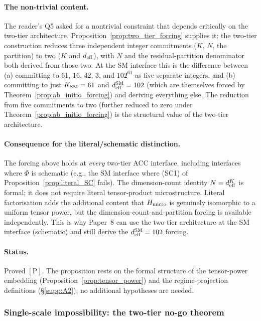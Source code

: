 \documentclass[11pt]{article}
\theoremstyle{plain}
\theoremstyle{definition}
\theoremstyle{remark}
\begin{document}
\paragraph{The non-trivial content.}  The reader's Q5 asked for a nontrivial constraint that depends critically on the two-tier architecture.  Proposition~\ref{prop:two_tier_forcing} supplies it: the two-tier construction reduces three independent integer commitments ($K$, $N$, the partition) to two ($K$ and $d_{\rm eff}$), with $N$ and the residual-partition denominator both derived from those two.  At the SM interface this is the difference between (a) committing to 61, 16, 42, 3, and $102^{61}$ as five separate integers, and (b) committing to just $K_{\rm SM} = 61$ and $d_{\rm eff}^{\rm SM} = 102$ (which are themselves forced by Theorem~\ref{prop:ab_initio_forcing}) and deriving everything else.  The reduction from five commitments to two (further reduced to zero under Theorem~\ref{prop:ab_initio_forcing}) is the structural value of the two-tier architecture.

\paragraph{Consequence for the literal/schematic distinction.}  The forcing above holds at \emph{every} two-tier ACC interface, including interfaces where $\Phi$ is schematic (e.g., the SM interface where (SC1) of Proposition~\ref{prop:literal_SC} fails).  The dimension-count identity $N = d_{\rm eff}^K$ is formal; it does not require literal tensor-product microstructure.  Literal factorisation adds the additional content that $H_{\rm micro}$ is genuinely isomorphic to a uniform tensor power, but the dimension-count-and-partition forcing is available independently.  This is why Paper~8 can use the two-tier architecture at the SM interface (schematic) and still derive the $d_{\rm eff}^{\rm SM} = 102$ forcing.

\paragraph{Status.}  Proved $[\text{P}]$.  The proposition rests on the formal structure of the tensor-power embedding (Proposition~\ref{prop:tensor_power}) and the regime-projection definitions (\S\ref{supp:A2}); no additional hypotheses are needed.

\bigskip

\subsubsection*{Single-scale impossibility: the two-tier no-go theorem}
\end{document}
